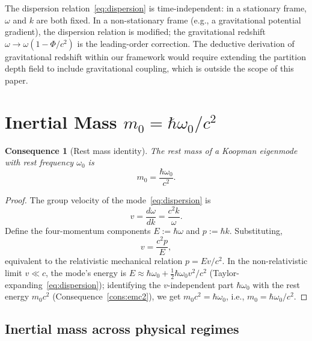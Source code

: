 \documentclass[11pt,twocolumn,a4paper]{article}
\theoremstyle{axiomstyle}
\theoremstyle{conseqstyle}
\newtheorem{consequence}{Consequence}
\theoremstyle{definition}
\theoremstyle{remark}
\begin{document}
The dispersion relation~\eqref{eq:dispersion} is time-independent: in a stationary frame, $\omega$ and $k$ are both fixed. In a non-stationary frame (e.g., a gravitational potential gradient), the dispersion relation is modified; the gravitational redshift $\omega\to\omega(1-\Phi/c^{2})$ is the leading-order correction. The deductive derivation of gravitational redshift within our framework would require extending the partition depth field to include gravitational coupling, which is outside the scope of this paper.

\section{Inertial Mass $m_{0}=\hbar\omega_{0}/c^{2}$}
\label{sec:restmass}

\begin{consequence}[Rest mass identity]
\label{cons:restmass}
The rest mass of a Koopman eigenmode with rest frequency $\omega_{0}$ is
\begin{equation}
m_{0}=\frac{\hbar\omega_{0}}{c^{2}}.
\label{eq:restmass}
\end{equation}
\end{consequence}

\begin{proof}
The group velocity of the mode~\eqref{eq:dispersion} is
\begin{equation*}
v=\frac{d\omega}{dk}=\frac{c^{2}k}{\omega}.
\end{equation*}
Define the four-momentum components $E:=\hbar\omega$ and $p:=\hbar k$. Substituting,
\begin{equation*}
v=\frac{c^{2}p}{E},
\end{equation*}
equivalent to the relativistic mechanical relation $p=Ev/c^{2}$. In the non-relativistic limit $v\ll c$, the mode's energy is $E\approx\hbar\omega_{0}+\tfrac{1}{2}\hbar\omega_{0}v^{2}/c^{2}$ (Taylor-expanding~\eqref{eq:dispersion}); identifying the $v$-independent part $\hbar\omega_{0}$ with the rest energy $m_{0}c^{2}$ (Consequence~\ref{cons:emc2}), we get $m_{0}c^{2}=\hbar\omega_{0}$, i.e., $m_{0}=\hbar\omega_{0}/c^{2}$.
\end{proof}

\subsection{Inertial mass across physical regimes}
\end{document}
